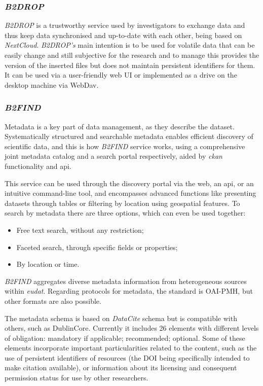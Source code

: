 \subsubsection{\textit{B2DROP}}
  
\textit{B2DROP} is a trustworthy service used by investigators to exchange data and thus keep data synchronised and up-to-date with each other, being based on \textit{NextCloud}.
\textit{B2DROP's} main intention is to be used for volatile data that can be easily change and still subjective for the research and to manage this provides the version of the inserted files but does not maintain persistent identifiers for them. It can be used via a user-friendly web UI or implemented as a drive on the desktop machine via WebDav.
    
\subsubsection{\textit{B2FIND}}
\label{tab:b2find}

Metadata is a key part of data management, as they describe the dataset. Systematically structured and searchable metadata enables efficient discovery of scientific data, and this is how \textit{B2FIND} service works, using a comprehensive joint metadata catalog and a search portal respectively, aided by \textit{\gls{ckan}} functionality and \gls{api}.
  
This service can be used through the discovery portal via the web, an \gls{api}, or an intuitive command-line tool, and encompasses advanced functions like presenting datasets through tables or filtering by location using geospatial features. To search by metadata there are three options, which can even be used together:
  
\begin{itemize}
  \item Free text search, without any restriction;
  \item Faceted search, through specific fields or properties;
  \item By location or time.
\end{itemize}
  
\textit{B2FIND} aggregates diverse metadata information from heterogeneous sources within \textit{\gls{eudat}}. Regarding protocols for metadata, the standard is OAI-PMH, but other formats are also possible. 
  
The metadata schema is based on \textit{DataCite} schema but is compatible with others, such as DublinCore. Currently it includes 26 elements with different levels of obligation: mandatory if applicable; recommended; optional. Some of these elements incorporate important particularities related to the content, such as the use of persistent identifiers of resources (the DOI being specifically intended to make citation available), or information about its licensing and consequent permission status for use by other researchers. 
  
